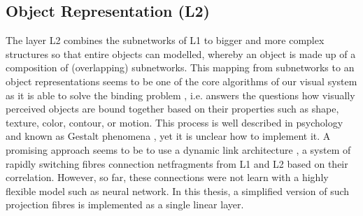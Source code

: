 \subsection{Object Representation (L2)}
The layer L2 combines the subnetworks of L1 to bigger and more complex structures so that entire objects can modelled, whereby an object is made up of a composition of (overlapping) subnetworks.
This mapping from subnetworks to an object representations seems to be one of the core algorithms of our visual system as it is able to solve the binding problem , i.e. answers the questions how visually perceived objects are bound together based on their properties such as shape, texture, color, contour, or motion. This process is well described in psychology and known as Gestalt phenomena , yet it is unclear how to implement it.
A promising approach seems to be to use a dynamic link architecture , 
a system of rapidly switching fibres connection netfragments from L1 and L2 based on their correlation.
However, so far, these connections were not learn with a highly flexible model such as neural network.
In this thesis, a simplified version of such projection fibres is implemented as a single linear layer.

